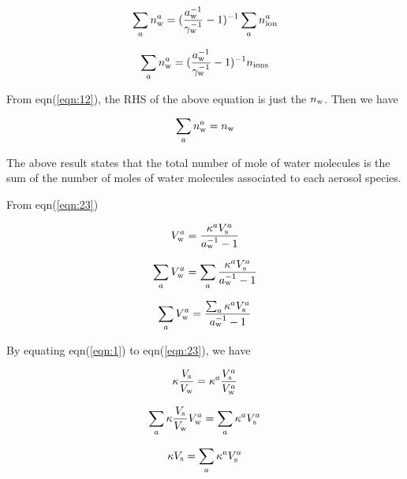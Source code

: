 \documentclass[12pt]{article}
\begin{document}
\begin{equation}
\sum_{a} n_{\rm w}^{a}=(\frac{a_{\rm w}^{-1}}{\gamma_{\rm w}^{-1}}-1)^{-1}\sum_{a}n_{\rm ion}^{a}
\end{equation}

\begin{equation}
\sum_{a} n_{\rm w}^{a}=(\frac{a_{\rm w}^{-1}}{\gamma_{\rm w}^{-1}}-1)^{-1} n_{\rm ions}
\end{equation}

From eqn(\ref{eqn:12}), the RHS of the above equation is just the $n_{\rm w}$. Then we have 

\begin{equation}
\sum_{a} n_{\rm w}^{a}=n_{\rm w}
\end{equation}

The above result states that the total number of mole of water molecules is the sum of the number of moles of water molecules associated to each aerosol species. 


From eqn(\ref{eqn:23})

\begin{equation}
V_{\rm w}^{a}=\frac{\kappa^{a} V_{\rm s}^{a}}{a_{\rm w}^{-1}-1}
\end{equation}

\begin{equation}
\sum_{a}V_{\rm w}^{a}  =\sum_{a}\frac{\kappa^{a} V_{\rm s}^{a}}{a_{\rm w}^{-1}-1}
\end{equation}

\begin{equation}
\sum_{a}V_{\rm w}^{a}  =\frac{\sum_{a}\kappa^{a} V_{\rm s}^{a}}{a_{\rm w}^{-1}-1}
\end{equation}




By equating eqn(\ref{eqn:1}) to eqn(\ref{eqn:23}), we have

\begin{equation}\label{eqn:28}
\kappa \frac{V_{\rm s}}{V_{\rm w}}= \kappa^{a} \frac{V_{\rm s}^{a}}{V_{\rm w}^{a}}
\end{equation}

\begin{equation}\label{eqn:29}
\sum_{a} \kappa \frac{V_{\rm s}}{V_{\rm w}} V_{\rm w}^{a}= \sum_{a} \kappa^{a} V_{\rm s}^{a}
\end{equation}

\begin{equation}\label{eqn:30}
\kappa V_{\rm s}= \sum_{a} \kappa^{a} V_{\rm s}^{a}
\end{equation}
\end{document}
